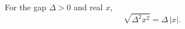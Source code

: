 \documentclass{article}
\begin{document}
For the gap $\Delta>0$ and real $x$,
\begin{equation}
\sqrt{\Delta^2 x^2} = \Delta\,|x| .
\label{eq:p}
\end{equation}
\end{document}
